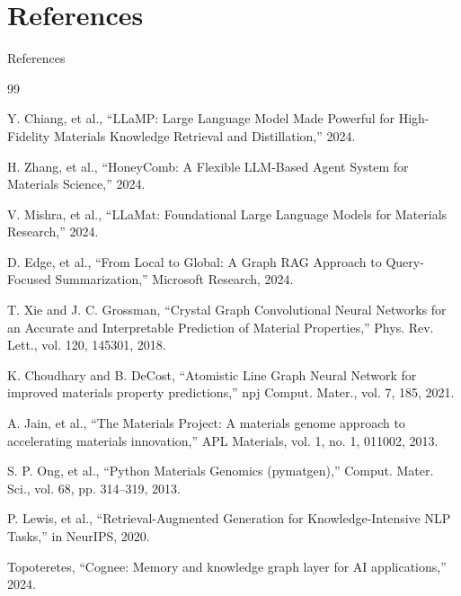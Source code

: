 \documentclass{beamer}
\begin{document}
\section{References}
\begin{frame}{References}

\begin{thebibliography}{99}
\footnotesize

 Y. Chiang, et al., ``LLaMP: Large Language Model Made Powerful for High-Fidelity Materials Knowledge Retrieval and Distillation,'' 2024.

 H. Zhang, et al., ``HoneyComb: A Flexible LLM-Based Agent System for Materials Science,'' 2024.

 V. Mishra, et al., ``LLaMat: Foundational Large Language Models for Materials Research,'' 2024.

 D. Edge, et al., ``From Local to Global: A Graph RAG Approach to Query-Focused Summarization,'' Microsoft Research, 2024.

 T. Xie and J. C. Grossman, ``Crystal Graph Convolutional Neural Networks for an Accurate and Interpretable Prediction of Material Properties,'' Phys. Rev. Lett., vol. 120, 145301, 2018.

 K. Choudhary and B. DeCost, ``Atomistic Line Graph Neural Network for improved materials property predictions,'' npj Comput. Mater., vol. 7, 185, 2021.

 A. Jain, et al., ``The Materials Project: A materials genome approach to accelerating materials innovation,'' APL Materials, vol. 1, no. 1, 011002, 2013.

 S. P. Ong, et al., ``Python Materials Genomics (pymatgen),'' Comput. Mater. Sci., vol. 68, pp. 314--319, 2013.

 P. Lewis, et al., ``Retrieval-Augmented Generation for Knowledge-Intensive NLP Tasks,'' in NeurIPS, 2020.

 Topoteretes, ``Cognee: Memory and knowledge graph layer for AI applications,'' 2024.

\end{thebibliography}

\end{frame}
\end{document}
